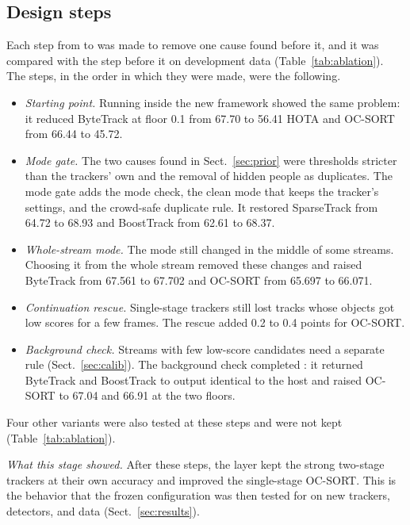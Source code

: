 \subsection{Design steps}\label{sec:steps}
Each step from \aob{} to \scl{} was made to remove one cause found before it,
and it was compared with the step before it on development data
(Table~\ref{tab:ablation}). The steps, in the order in which they were made,
were the following.
\begin{itemize}
\item \emph{Starting point.} Running \aob{} inside the new framework showed
      the same problem: it reduced ByteTrack at floor 0.1 from 67.70 to 56.41
      HOTA and OC-SORT from 66.44 to 45.72.
\item \emph{Mode gate.} The two causes found in Sect.~\ref{sec:prior} were
      thresholds stricter than the trackers' own and the removal of hidden
      people as duplicates. The mode gate adds the mode check, the clean mode
      that keeps the tracker's settings, and the crowd-safe duplicate rule. It
      restored SparseTrack from 64.72 to 68.93 and BoostTrack from 62.61
      to 68.37.
\item \emph{Whole-stream mode.} The mode still changed in the middle of some
      streams. Choosing it from the whole stream removed these changes and
      raised ByteTrack from 67.561 to 67.702 and OC-SORT from 65.697 to
      66.071.
\item \emph{Continuation rescue.} Single-stage trackers still lost tracks
      whose objects got low scores for a few frames. The rescue added 0.2 to
      0.4 points for OC-SORT.
\item \emph{Background check.} Streams with few low-score candidates need a
      separate rule (Sect.~\ref{sec:calib}). The background check
      completed \scl{}: it returned ByteTrack and BoostTrack to output
      identical to the host and raised OC-SORT to 67.04 and 66.91 at the two
      floors.
\end{itemize}
Four other variants were also tested at these steps and were not kept
(Table~\ref{tab:ablation}).

\emph{What this stage showed.} After these steps, the layer kept the strong
two-stage trackers at their own accuracy and improved the single-stage
OC-SORT. This is the behavior that the frozen configuration was then tested
for on new trackers, detectors, and data (Sect.~\ref{sec:results}).



